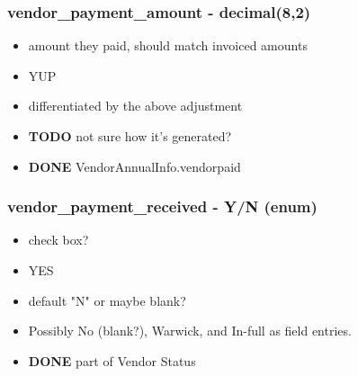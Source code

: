 \documentclass[captions=tablesignature]{scrartcl}
\begin{document}
\subsubsection{vendor\_payment\_amount - decimal(8,2)}
\label{sec-2-2-16}
\begin{itemize}
\item amount they paid, should match invoiced amounts
\item YUP
\item differentiated by the above adjustment
\end{itemize}
\begin{itemize}
\item {\bfseries\sffamily TODO} not sure how it's generated?
\label{sec-2-2-16-1}
\item {\bfseries\sffamily DONE} VendorAnnualInfo.vendorpaid
\label{sec-2-2-16-2}
\end{itemize}

\subsubsection{vendor\_payment\_received - Y/N (enum)}
\label{sec-2-2-17}
\begin{itemize}
\item check box?
\item YES
\item default "N" or maybe blank?
\item Possibly No (blank?), Warwick, and In-full as field entries.
\end{itemize}
\begin{itemize}
\item {\bfseries\sffamily DONE} part of Vendor Status
\label{sec-2-2-17-1}
\end{itemize}
\end{document}
